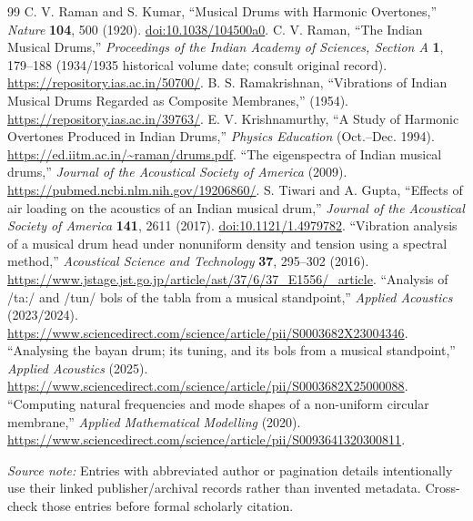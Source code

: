 \documentclass[11pt,letterpaper]{article}
\begin{document}
\begin{thebibliography}{99}\small
{} C. V. Raman and S. Kumar, ``Musical Drums with Harmonic Overtones,'' \emph{Nature} \textbf{104}, 500 (1920). \href{https://doi.org/10.1038/104500a0}{doi:10.1038/104500a0}.
 C. V. Raman, ``The Indian Musical Drums,'' \emph{Proceedings of the Indian Academy of Sciences, Section A} \textbf{1}, 179--188 (1934/1935 historical volume date; consult original record). \url{https://repository.ias.ac.in/50700/}.
 B. S. Ramakrishnan, ``Vibrations of Indian Musical Drums Regarded as Composite Membranes,'' (1954). \url{https://repository.ias.ac.in/39763/}.
 E. V. Krishnamurthy, ``A Study of Harmonic Overtones Produced in Indian Drums,'' \emph{Physics Education} (Oct.--Dec. 1994). \url{https://ed.iitm.ac.in/~raman/drums.pdf}.
 ``The eigenspectra of Indian musical drums,'' \emph{Journal of the Acoustical Society of America} (2009). \url{https://pubmed.ncbi.nlm.nih.gov/19206860/}.
 S. Tiwari and A. Gupta, ``Effects of air loading on the acoustics of an Indian musical drum,'' \emph{Journal of the Acoustical Society of America} \textbf{141}, 2611 (2017). \href{https://doi.org/10.1121/1.4979782}{doi:10.1121/1.4979782}.
 ``Vibration analysis of a musical drum head under nonuniform density and tension using a spectral method,'' \emph{Acoustical Science and Technology} \textbf{37}, 295--302 (2016). \url{https://www.jstage.jst.go.jp/article/ast/37/6/37_E1556/_article}.
 ``Analysis of /ta:/ and /tun/ bols of the tabla from a musical standpoint,'' \emph{Applied Acoustics} (2023/2024). \url{https://www.sciencedirect.com/science/article/pii/S0003682X23004346}.
 ``Analysing the bayan drum; its tuning, and its bols from a musical standpoint,'' \emph{Applied Acoustics} (2025). \url{https://www.sciencedirect.com/science/article/pii/S0003682X25000088}.
 ``Computing natural frequencies and mode shapes of a non-uniform circular membrane,'' \emph{Applied Mathematical Modelling} (2020). \url{https://www.sciencedirect.com/science/article/pii/S0093641320300811}.
\end{thebibliography}
\noindent\textit{Source note:} Entries with abbreviated author or pagination details intentionally use their linked publisher/archival records rather than invented metadata. Cross-check those entries before formal scholarly citation.
\end{document}
